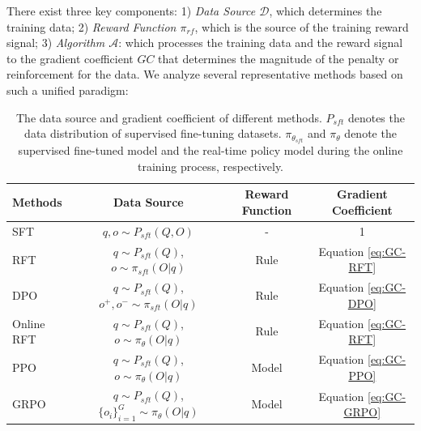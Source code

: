 There exist three key components: 1) \textit{Data Source $\mathcal{D}$}, which determines the training data; 2) \textit{Reward Function $\pi_{{rf}}$}, which is the source of the training reward signal; 3) \textit{Algorithm $\mathcal{A}$}: which processes the training data and the reward signal to the gradient coefficient $GC$ that determines the magnitude of the penalty or reinforcement for the data. We analyze several representative methods based on such a unified paradigm:

\begin{table}[t]
    \centering
    \begin{small}
    \begin{tabular}{lccc}
    \toprule
     \textbf{Methods} & \textbf{Data Source}  & \textbf{Reward Function} & \textbf{Gradient Coefficient}  \\
    \midrule
    SFT & $q, o \sim P_{sft}(Q, O)$& - &  1 \\
    \midrule
    RFT  & $q \sim P_{sft}(Q)$, $o \sim \pi_{sft}(O|q)$ & Rule & Equation \ref{eq:GC-RFT} \\
     DPO & $q \sim P_{sft}(Q)$, $o^+, o^- \sim \pi_{sft}(O|q)$ & Rule & Equation \ref{eq:GC-DPO} \\
    \midrule
    Online RFT  & $q \sim P_{sft}(Q)$, $o \sim \pi_{\theta}(O|q)$ & Rule & Equation \ref{eq:GC-RFT} \\
    PPO & $q \sim P_{sft}(Q)$, $o \sim \pi_{\theta}(O|q)$ & Model & Equation \ref{eq:GC-PPO} \\
    GRPO & $q \sim P_{sft}(Q)$, $\{o_i\}_{i=1}^G \sim \pi_{\theta}(O|q)$ & Model & Equation \ref{eq:GC-GRPO} \\

    \bottomrule
    \end{tabular}
    \end{small}
    \caption{The data source and gradient coefficient of different methods. $P_{sft}$ denotes the data distribution of supervised fine-tuning datasets. $\pi_{\theta_{sft}}$ and $\pi_{\theta}$ denote the supervised fine-tuned model and the real-time policy model during the online training process, respectively.}
    \label{tab:data_policy}

\end{table}

